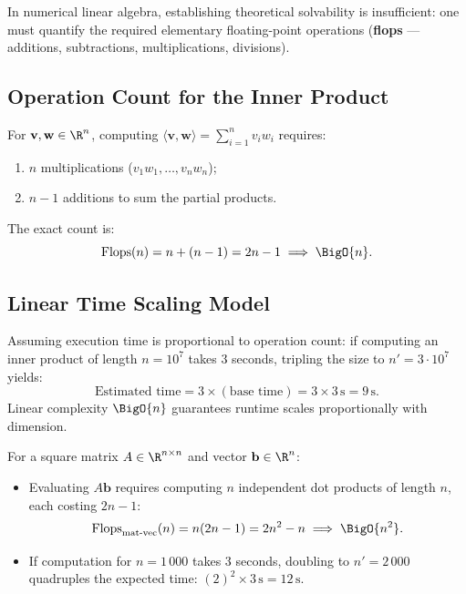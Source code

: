 In numerical linear algebra, establishing theoretical solvability is insufficient: one must quantify the required elementary floating-point operations (\textbf{flops} — additions, subtractions, multiplications, divisions).

\subsection{Operation Count for the Inner Product}

For $\mathbf{v}, \mathbf{w} \in \R^n$, computing $\langle \mathbf{v}, \mathbf{w} \rangle = \sum_{i=1}^n v_i w_i$ requires:
\begin{enumerate}
    \item $n$ multiplications ($v_1 w_1, \dots, v_n w_n$);
    \item $n - 1$ additions to sum the partial products.
\end{enumerate}
The exact count is:
\begin{equation}
    \text{Flops}(n) = n + (n - 1) = 2n - 1 \implies \BigO{n}.
\end{equation}

\subsection{Linear Time Scaling Model}

Assuming execution time is proportional to operation count: if computing an inner product of length $n = 10^7$ takes $3$ seconds, tripling the size to $n' = 3 \cdot 10^7$ yields:
\begin{equation}
    \text{Estimated time} = 3 \times (\text{base time}) = 3 \times 3\,\text{s} = 9\,\text{s}.
\end{equation}
Linear complexity $\BigO{n}$ guarantees runtime scales proportionally with dimension.

\begin{remark}
For a square matrix $A \in \R^{n \times n}$ and vector $\mathbf{b} \in \R^n$:
\begin{itemize}
    \item Evaluating $A \mathbf{b}$ requires computing $n$ independent dot products of length $n$, each costing $2n - 1$:
    \begin{equation}
        \text{Flops}_{\text{mat-vec}}(n) = n (2n - 1) = 2n^2 - n \implies \BigO{n^2}.
    \end{equation}
    \item If computation for $n = 1\,000$ takes $3$ seconds, doubling to $n' = 2\,000$ quadruples the expected time: $(2)^2 \times 3\,\text{s} = 12\,\text{s}$.
\end{itemize}
\end{remark}

